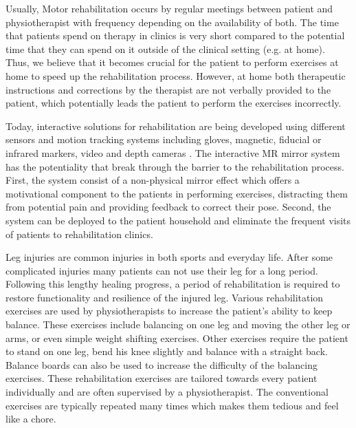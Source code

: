 Usually, Motor rehabilitation occurs by regular meetings between patient and physiotherapist with frequency depending on the availability of both. The time that patients spend on therapy in clinics is very short compared to the potential time that they can spend on it outside of the clinical setting (e.g. at home). Thus, we believe that it becomes crucial for the patient to perform exercises at home to speed up the rehabilitation process. However, at home both therapeutic instructions and corrections by the therapist are not verbally provided to the patient, which potentially leads the patient to perform the exercises incorrectly.

Today, interactive solutions for rehabilitation are being developed using different sensors and motion tracking systems including gloves, magnetic, fiducial or infrared markers, video and depth cameras \cite{DaGama2015,Cho2014}. The interactive MR mirror system has the potentiality that break through the barrier to the rehabilitation process. First, the system consist of a non-physical mirror effect which offers a motivational component to the patients in performing exercises, distracting them from potential pain and providing feedback to correct their pose. Second, the system can be deployed to the patient household and eliminate the frequent visits of patients to rehabilitation clinics.

Leg injuries are common injuries in both sports and everyday life. After some complicated injuries many patients can not use their leg for a long period. Following this lengthy healing progress, a period of rehabilitation is required to restore functionality and resilience of the injured leg. Various rehabilitation exercises are used by physiotherapists to increase the patient's ability to keep balance. 
These exercises include balancing on one leg and moving the other leg or arms, or even simple weight shifting exercises. Other exercises require the patient to stand on one leg, bend his knee slightly and balance with a straight back. Balance boards can also be used to increase the difficulty of the balancing exercises. These rehabilitation exercises are tailored towards every patient individually and are often supervised by a physiotherapist. The conventional exercises are typically repeated many times which makes them tedious and feel like a chore.

